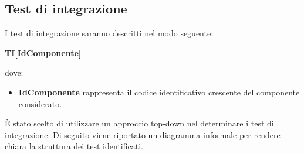\documentclass[../PianoDiQualifica_v4.0.0.tex]{subfiles}
\begin{document}
	\subsection{Test di integrazione}
	I test di integrazione saranno descritti nel modo seguente:
	\begin{center}
		\textbf{TI[IdComponente]}
	\end{center}
	dove:
	\begin{itemize}
		\item \textbf{IdComponente} rappresenta il codice identificativo crescente del componente considerato.
	\end{itemize}
	È stato scelto di utilizzare un approccio top-down nel determinare i test di integrazione. Di seguito viene riportato un diagramma informale per rendere chiara la struttura dei test identificati.
	\\
\end{document}
